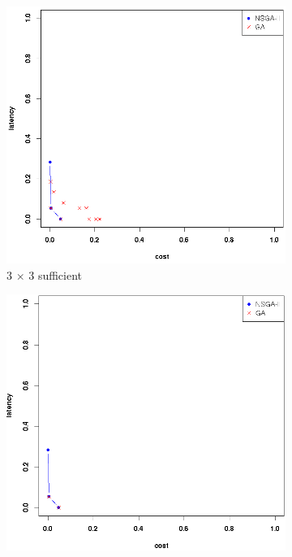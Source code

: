 \documentclass{llncs}
\begin{document}
\begin{figure}[H]
	\centering
	\begin{subfigure}[b]{0.45\textwidth}
		\includegraphics[width=\textwidth]{pics/pop_50_gen_50_3_times_3_suff.png}
		\caption{3 $\times$ 3 sufficient}
	\end{subfigure}%
	\begin{subfigure}[b]{0.45\textwidth}
		\includegraphics[width=\textwidth]{pics/pop_50_gen_50_3_times_3_minimum.png}

\end{subfigure}
\end{figure}
\end{document}
